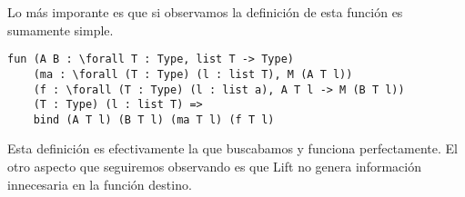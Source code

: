 Lo más imporante es que si observamos la definición de esta función es sumamente simple.

\begin{lstlisting}
fun (A B : \forall T : Type, list T -> Type)
    (ma : \forall (T : Type) (l : list T), M (A T l))
    (f : \forall (T : Type) (l : list a), A T l -> M (B T l))
    (T : Type) (l : list T) =>
    bind (A T l) (B T l) (ma T l) (f T l)
\end{lstlisting}

Esta definición es efectivamente la que buscabamos y funciona perfectamente.
El otro aspecto que seguiremos observando es que Lift no genera información innecesaria en la función destino.